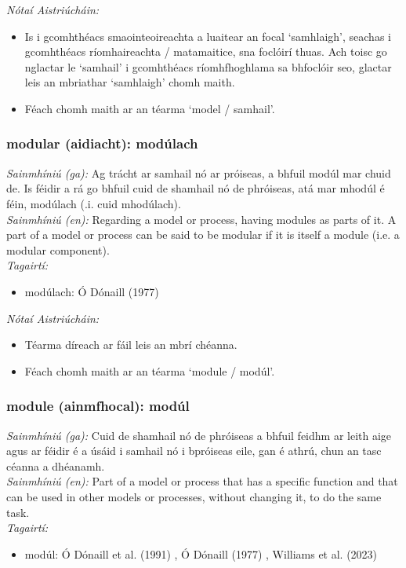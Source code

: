  \noindent \textit{Nótaí Aistriúcháin:}
\begin{itemize}
	\item Is i gcomhthéacs smaointeoireachta a luaitear an focal `samhlaigh', seachas i gcomhthéacs ríomhaireachta / matamaitice, sna foclóirí thuas. Ach toisc go nglactar le `samhail' i gcomhthéacs ríomhfhoghlama sa bhfoclóir seo, glactar leis an mbriathar `samhlaigh' chomh maith.
	\item Féach chomh maith ar an téarma `model / samhail'.
\end{itemize}


\subsubsection*{modular (aidiacht): modúlach}
 \noindent \textit{Sainmhíniú (ga):} Ag trácht ar samhail nó ar próiseas, a bhfuil modúl mar chuid de. Is féidir a rá go bhfuil cuid de shamhail nó de phróiseas, atá mar mhodúl é féin, modúlach (.i. cuid mhodúlach).
\\
 \noindent \textit{Sainmhíniú (en):} Regarding a model or process, having modules as parts of it. A part of a model or process can be said to be modular if it is itself a module (i.e. a modular component).
\\
 \noindent \textit{Tagairtí:}
\begin{itemize}
	\item modúlach: Ó Dónaill (1977) \cite{odonaill}
\end{itemize}

 \noindent \textit{Nótaí Aistriúcháin:}
\begin{itemize}
	\item Téarma díreach ar fáil leis an mbrí chéanna.
	\item Féach chomh maith ar an téarma `module / modúl'.
\end{itemize}


\subsubsection*{module (ainmfhocal): modúl}
 \noindent \textit{Sainmhíniú (ga):} Cuid de shamhail nó de phróiseas a bhfuil feidhm ar leith aige agus ar féidir é a úsáid i samhail nó i bpróiseas eile, gan é athrú, chun an tasc céanna a dhéanamh.
\\
 \noindent \textit{Sainmhíniú (en):} Part of a model or process that has a specific function and that can be used in other models or processes, without changing it, to do the same task.
\\
 \noindent \textit{Tagairtí:}
\begin{itemize}
	\item modúl: Ó Dónaill et al. (1991) \cite{focloir-beag}, Ó Dónaill (1977) \cite{odonaill}, Williams et al. (2023) \cite{storchiste}
\end{itemize}

